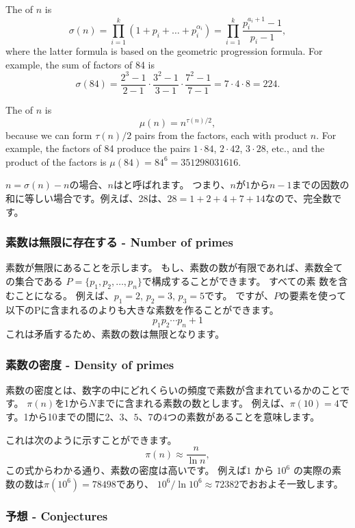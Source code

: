 The  of $n$ is
\[\sigma(n)=\prod_{i=1}^k (1+p_i+\ldots+p_i^{\alpha_i}) = \prod_{i=1}^k \frac{p_i^{a_i+1}-1}{p_i-1},\]
where the latter formula is based on the geometric progression formula.
For example, the sum of factors of 84 is
\[\sigma(84)=\frac{2^3-1}{2-1} \cdot \frac{3^2-1}{3-1} \cdot \frac{7^2-1}{7-1} = 7 \cdot 4 \cdot 8 = 224.\]

The  of $n$ is
\[\mu(n)=n^{\tau(n)/2},\]
because we can form $\tau(n)/2$ pairs from the factors,
each with product $n$.
For example, the factors of 84
produce the pairs
$1 \cdot 84$, $2 \cdot 42$, $3 \cdot 28$, etc.,
and the product of the factors is $\mu(84)=84^6=351298031616$.

$n=\sigma(n)-n$の場合、$n$はと呼ばれます。
つまり、$n$が$1$から$n - 1$までの因数の和に等しい場合です。例えば、28は、$28=1+2+4+7+14$なので、完全数です。

\subsubsection{素数は無限に存在する - Number of primes}


素数が無限にあることを示します。
もし、素数の数が有限であれば、素数全ての集合である
$P=\{p_1,p_2,\ldots,p_n\}$で構成することができます。
すべての素 数を含むことになる。
例えば、$p_1=2$, $p_2=3$, $p_3=5$です。
ですが、$P$の要素を使って以下のPに含まれるのよりも大きな素数を作ることができます。
\[p_1 p_2 \cdots p_n+1\]
これは矛盾するため、素数の数は無限となります。

\subsubsection{素数の密度 - Density of primes}

素数の密度とは、数字の中にどれくらいの頻度で素数が含まれているかのことです。
$\pi(n)$を1から$N$までに含まれる素数の数とします。
例えば、$\pi(10)=4$です。1から10までの間に$2、3、5、7$の4つの素数があることを意味します。

これは次のように示すことができます。
\[\pi(n) \approx \frac{n}{\ln n},\]
この式からわかる通り、素数の密度は高いです。
例えば$1$ から $10^6$ の実際の素数の数は$\pi(10^6)=78498$であり、
$10^6 / \ln 10^6 \approx 72382$でおおよそ一致します。

\subsubsection{予想 - Conjectures}

